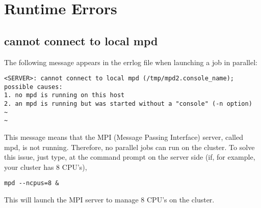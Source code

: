 
\section{Runtime Errors} \label{sec:troubleshooting-runtime}
\subsection*{cannot connect to local mpd}
The following message appears in the errlog file when launching a job in parallel:
\begin{lstlisting}
<SERVER>: cannot connect to local mpd (/tmp/mpd2.console_name);
possible causes:
1. no mpd is running on this host
2. an mpd is running but was started without a "console" (-n option)
~
~
\end{lstlisting}

This message means that the MPI (Message Passing Interface) server, called mpd, is not running. Therefore, no parallel jobs can run on the cluster. To solve this issue, just type, at the command prompt on the server side (if, for example, your cluster has 8 CPU's),
\begin{lstlisting}
mpd --ncpus=8 &
\end{lstlisting}
This will launch the MPI server to manage 8 CPU's on the cluster.

\clearpage %
